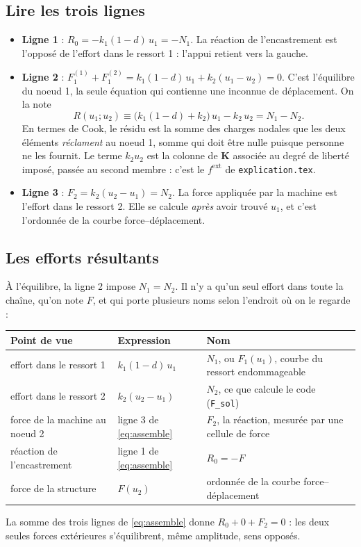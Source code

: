 \documentclass[11pt,a4paper]{article}
\newcommand{\kun}{k_1(1-d)}
\begin{document}
\subsection{Lire les trois lignes}
\begin{itemize}[nosep]
  \item \textbf{Ligne 1} : $R_0 = -\kun\,u_1 = -N_1$. La réaction de l'encastrement est l'opposé
        de l'effort dans le ressort 1 : l'appui retient vers la gauche.
  \item \textbf{Ligne 2} : $F_1^{(1)} + F_1^{(2)} = \kun\,u_1 + k_2(u_1-u_2) = 0$. C'est l'équilibre
        du noeud 1, la seule équation qui contienne une inconnue de déplacement. On la note
        \begin{equation}
          R(u_1;u_2) \equiv \bigl(\kun + k_2\bigr)\,u_1 - k_2\,u_2 = N_1 - N_2 .
          \label{eq:residu}
        \end{equation}
        En termes de Cook, le résidu est la somme des charges nodales que les deux éléments
        \emph{réclament} au noeud 1, somme qui doit être nulle puisque personne ne les fournit.
        Le terme $k_2u_2$ est la colonne de $\mathbf K$ associée au degré de liberté imposé,
        passée au second membre : c'est le $f^{\text{ext}}$ de \texttt{explication.tex}.
  \item \textbf{Ligne 3} : $F_2 = k_2(u_2-u_1) = N_2$. La force appliquée par la machine est
        l'effort dans le ressort 2. Elle se calcule \emph{après} avoir trouvé $u_1$, et c'est
        l'ordonnée de la courbe force--déplacement.
\end{itemize}

\subsection{Les efforts résultants}
À l'équilibre, la ligne 2 impose $N_1 = N_2$. Il n'y a qu'un seul effort dans toute la
chaîne, qu'on note $F$, et qui porte plusieurs noms selon l'endroit où on le regarde :
\begin{center}
\begin{tabular}{@{}lll@{}}
\toprule
Point de vue & Expression & Nom\\
\midrule
effort dans le ressort 1 & $\kun\,u_1$ & $N_1$, ou $F_1(u_1)$, courbe du ressort endommageable\\
effort dans le ressort 2 & $k_2(u_2-u_1)$ & $N_2$, ce que calcule le code (\texttt{F\_sol})\\
force de la machine au noeud 2 & ligne 3 de \eqref{eq:assemble} & $F_2$, la réaction, mesurée par une cellule de force\\
réaction de l'encastrement & ligne 1 de \eqref{eq:assemble} & $R_0 = -F$\\
force de la structure & $F(u_2)$ & ordonnée de la courbe force--déplacement\\
\bottomrule
\end{tabular}
\end{center}
La somme des trois lignes de \eqref{eq:assemble} donne $R_0 + 0 + F_2 = 0$ : les deux seules
forces extérieures s'équilibrent, même amplitude, sens opposés.
\end{document}
